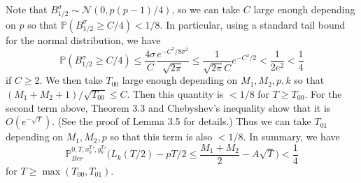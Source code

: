 \documentclass[12pt]{article}
\begin{document}
	Note that $B_{1/2}^{\sigma}\sim\mathcal{N}(0,p(p-1)/4)$, so we can take $C$ large enough depending on $p$ so that $\mathbb{P}(B_{1/2}^{\sigma} \geq C/4) < 1/8$. In particular, using a standard tail bound for the normal distribution, we have
	\[
	\mathbb{P}(B_{1/2}^{\sigma} \geq C/4) \leq \frac{4\sigma}{C}\frac{e^{-C^2/8\sigma^2}}{\sqrt{2\pi}} \leq \frac{1}{\sqrt{2\pi}C}e^{-C^2/2} < \frac{1}{2e^2} < \frac{1}{4}
	\]
	if $C\geq 2$. We then take $T_{00}$ large enough depending on $M_1,M_2,p,k$ so that $(M_1+M_2+1)/\sqrt{T_{00}}\leq C$. Then this quantity is $<1/8$ for $T\geq T_{00}$. For the second term above, Theorem 3.3 and Chebyshev's inequality show that it is $O(e^{-\sqrt{T}})$. (See the proof of Lemma 3.5 for details.) Thus we can take $T_{01}$ depending on $M_1,M_2,p$ so that this term is also $<1/8$. In summary, we have
	\[
	\mathbb{P}^{0,T,x_k^T{}',y_k^T{}'}_{Ber} \Big( L_k(T/2) - pT/2 \leq \frac{M_1+M_2}{2} - A\sqrt{T} \Big) < \frac{1}{4}
	\]
	for $T\geq\max(T_{00},T_{01})$.
	
\end{document}
